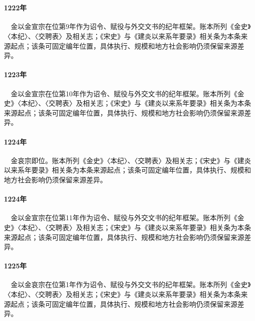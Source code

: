 \section{}

\paragraph{1222年}　金以金宣宗在位第9年作为诏令、赋役与外交文书的纪年框架。账本所列《金史》〈本纪〉、〈交聘表〉及相关志；《宋史》与《建炎以来系年要录》相关条为本条来源起点；该条可固定编年位置，具体执行、规模和地方社会影响仍须保留来源差异。

\paragraph{1223年}　金以金宣宗在位第10年作为诏令、赋役与外交文书的纪年框架。账本所列《金史》〈本纪〉、〈交聘表〉及相关志；《宋史》与《建炎以来系年要录》相关条为本条来源起点；该条可固定编年位置，具体执行、规模和地方社会影响仍须保留来源差异。

\paragraph{1224年}　金哀宗即位。账本所列《金史》〈本纪〉、〈交聘表〉及相关志；《宋史》与《建炎以来系年要录》相关条为本条来源起点；该条可固定编年位置，具体执行、规模和地方社会影响仍须保留来源差异。

\paragraph{1224年}　金以金宣宗在位第11年作为诏令、赋役与外交文书的纪年框架。账本所列《金史》〈本纪〉、〈交聘表〉及相关志；《宋史》与《建炎以来系年要录》相关条为本条来源起点；该条可固定编年位置，具体执行、规模和地方社会影响仍须保留来源差异。

\paragraph{1225年}　金以金哀宗在位第1年作为诏令、赋役与外交文书的纪年框架。账本所列《金史》〈本纪〉、〈交聘表〉及相关志；《宋史》与《建炎以来系年要录》相关条为本条来源起点；该条可固定编年位置，具体执行、规模和地方社会影响仍须保留来源差异。

